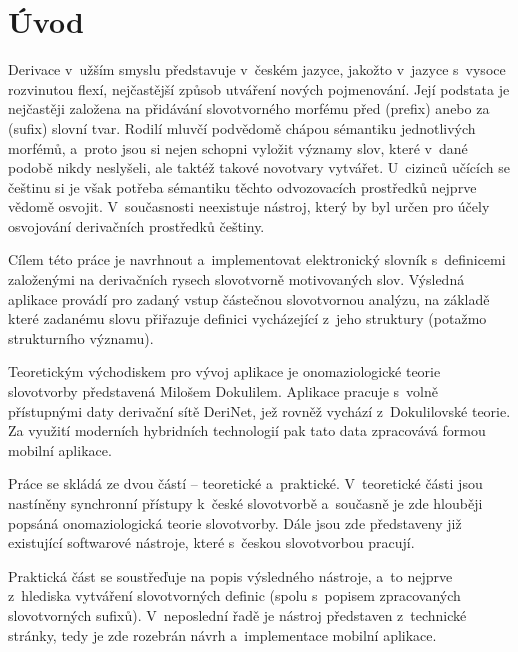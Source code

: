 \hypertarget{uxfavod}{%
\chapter*{Úvod}\label{uvod}
}

Derivace v~užším smyslu představuje v~českém jazyce, jakožto v~jazyce
s~vysoce rozvinutou flexí, nejčastější způsob utváření nových pojmenování.
Její podstata je nejčastěji založena na přidávání slovotvorného morfému
před (prefix) anebo za (sufix) slovní tvar. Rodilí mluvčí podvědomě
chápou sémantiku jednotlivých morfémů, a~proto jsou si nejen schopni
vyložit významy slov, které v~dané podobě nikdy neslyšeli, ale taktéž
takové novotvary vytvářet. U~cizinců učících se češtinu si je však
potřeba sémantiku těchto odvozovacích prostředků nejprve vědomě osvojit.
V~současnosti neexistuje nástroj, který by byl určen pro účely
osvojování derivačních prostředků češtiny.

Cílem této práce je navrhnout a~implementovat elektronický slovník
s~definicemi založenými na derivačních rysech slovotvorně motivovaných
slov. Výsledná aplikace provádí pro zadaný vstup částečnou slovotvornou
analýzu, na základě které zadanému slovu přiřazuje definici vycházející
z~jeho struktury (potažmo strukturního významu).

Teoretickým východiskem pro vývoj aplikace je onomaziologické teorie
slovotvorby představená Milošem Dokulilem. Aplikace pracuje s~volně
přístupnými daty derivační sítě DeriNet, jež rovněž vychází
z~Dokulilovské teorie. Za využití moderních hybridních technologií pak
tato data zpracovává formou mobilní aplikace.

Práce se skládá ze dvou částí -- teoretické a~praktické. V~teoretické
části jsou nastíněny synchronní přístupy k~české slovotvorbě a~současně
je zde hlouběji popsáná onomaziologická teorie slovotvorby. Dále jsou
zde představeny již existující softwarové nástroje, které s~českou
slovotvorbou pracují.

Praktická část se soustřeďuje na popis výsledného nástroje, a~to nejprve
z~hlediska vytváření slovotvorných definic (spolu s~popisem zpracovaných
slovotvorných sufixů). V~neposlední řadě je nástroj představen
z~technické stránky, tedy je zde rozebrán návrh a~implementace mobilní
aplikace.
